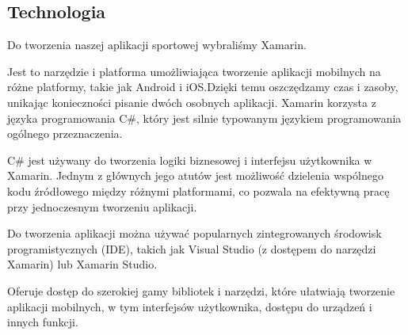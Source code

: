 \subsection{Technologia}  %

Do tworzenia naszej aplikacji sportowej wybraliśmy Xamarin.

Jest to narzędzie i platforma umożliwiająca tworzenie aplikacji mobilnych na różne platformy, takie jak Android i iOS.Dzięki temu oszczędzamy czas i zasoby, unikając konieczności pisanie dwóch osobnych aplikacji. Xamarin korzysta z języka programowania C\#, który jest silnie typowanym językiem programowania ogólnego przeznaczenia.

C\# jest używany do tworzenia logiki biznesowej i interfejsu użytkownika w Xamarin.
Jednym z głównych jego atutów jest możliwość dzielenia wspólnego kodu źródłowego między różnymi platformami, co pozwala na efektywną pracę przy jednoczesnym tworzeniu aplikacji.

Do tworzenia aplikacji można używać popularnych zintegrowanych środowisk programistycznych (IDE), takich jak Visual Studio (z dostępem do narzędzi Xamarin) lub Xamarin Studio.

Oferuje dostęp do szerokiej gamy bibliotek i narzędzi, które ułatwiają tworzenie aplikacji mobilnych, w tym interfejsów użytkownika, dostępu do urządzeń i innych funkcji.

